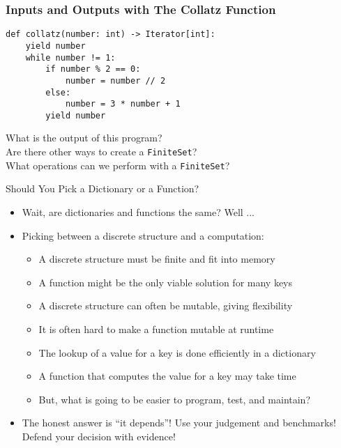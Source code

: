 \documentclass[14pt,aspectratio=169]{beamer}
\begin{document}
%
\begin{frame}[fragile]
  \frametitle{Inputs and Outputs with The Collatz Function}
  \hspace*{-.2in}
  \begin{minipage}{6in}
    \vspace*{.25in}
    \begin{verbatim}
def collatz(number: int) -> Iterator[int]:
    yield number
    while number != 1:
        if number % 2 == 0:
            number = number // 2
        else:
            number = 3 * number + 1
        yield number
    \end{verbatim}
  \end{minipage}
  \vspace*{.25in}
  \begin{center}
    \normalsize \noindent What is the output of this program? \\
    \normalsize \noindent Are there other ways to create a {\tt FiniteSet}? \\
    \normalsize \noindent What operations can we perform with a {\tt FiniteSet}? \\
  \end{center}
\end{frame}

%
\begin{frame}{Should You Pick a Dictionary or a Function?}
  \begin{itemize}
    \item Wait, are dictionaries and functions the same? Well ...
      \vspace*{-.15in}
    \item Picking between a discrete structure and a computation:
      \begin{itemize}
        \item A discrete structure must be finite and fit into memory
        \item A function might be the only viable solution for many keys
        \item A discrete structure can often be mutable, giving flexibility
        \item It is often hard to make a function mutable at runtime
        \item The lookup of a value for a key is done efficiently in a
          dictionary
        \item A function that computes the value for a key may take time
        \item But, what is going to be easier to program, test, and maintain?
      \end{itemize}
      \vspace*{-.2in}
    \item The honest answer is ``it depends''! Use your judgement and
      benchmarks! Defend your decision with evidence!
  \end{itemize}
\end{frame}
\end{document}
